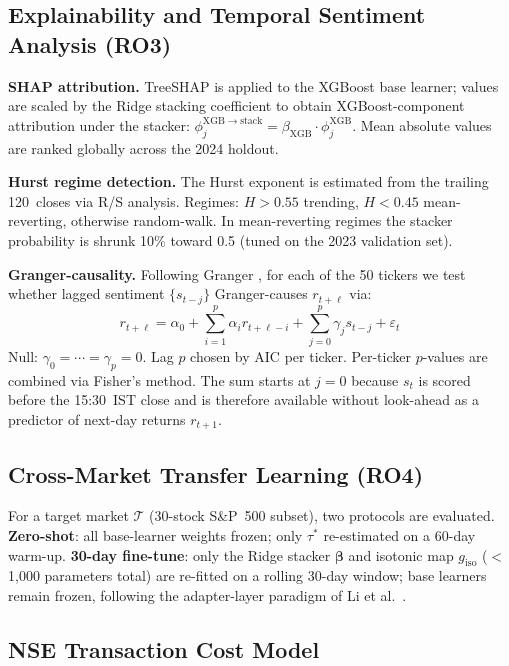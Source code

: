 \documentclass[12pt,a4paper]{article}
\begin{document}
\subsection{Explainability and Temporal Sentiment Analysis (RO3)}

\textbf{SHAP attribution.} TreeSHAP \cite{r20} is applied to the XGBoost base
learner; values are scaled by the Ridge stacking coefficient to obtain
XGBoost-component attribution under the stacker:
$\phi_j^{\mathrm{XGB}\to\mathrm{stack}}=\beta_{\mathrm{XGB}}\cdot\phi_j^{\mathrm{XGB}}$.
Mean absolute values are ranked globally across the 2024 holdout.

\textbf{Hurst regime detection.} The Hurst exponent \cite{r19} is estimated from the
trailing 120~closes via R/S analysis. Regimes: $H>0.55$ trending, $H<0.45$
mean-reverting, otherwise random-walk. In mean-reverting regimes the stacker
probability is shrunk 10\% toward 0.5 (tuned on the 2023 validation set).

\textbf{Granger-causality.} Following Granger \cite{r30}, for each of the 50 tickers we test whether lagged
sentiment $\{s_{t-j}\}$ Granger-causes $r_{t+\ell}$ via:
\begin{equation}
r_{t+\ell}=\alpha_0+\sum_{i=1}^{p}\alpha_i r_{t+\ell-i}+\sum_{j=0}^{p}\gamma_j s_{t-j}+\varepsilon_t
\label{eq:granger}
\end{equation}
Null: $\gamma_0=\cdots=\gamma_p=0$. Lag $p$ chosen by AIC per ticker. Per-ticker
$p$-values are combined via Fisher's method. The sum starts at $j=0$ because
$s_t$ is scored before the 15:30~IST close and is therefore available without
look-ahead as a predictor of next-day returns $r_{t+1}$.

\subsection{Cross-Market Transfer Learning (RO4)}

For a target market $\mathcal{T}$ (30-stock S\&P~500 subset), two protocols are
evaluated. \textbf{Zero-shot}: all base-learner weights frozen; only $\tau^*$
re-estimated on a 60-day warm-up. \textbf{30-day fine-tune}: only the Ridge
stacker $\boldsymbol{\beta}$ and isotonic map $g_{\mathrm{iso}}$
($<$1{,}000 parameters total) are re-fitted on a rolling 30-day window; base
learners remain frozen, following the adapter-layer paradigm of Li et al.\
\cite{r10}.

\subsection{NSE Transaction Cost Model}
\end{document}
